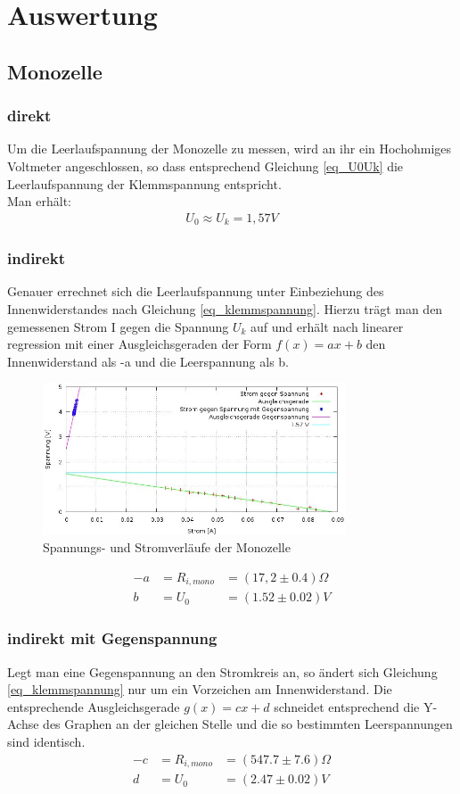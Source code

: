 \section{Auswertung}
\subsection{Monozelle}
\subsubsection{direkt}
Um die Leerlaufspannung der Monozelle zu messen, wird an ihr ein Hochohmiges Voltmeter angeschlossen, so dass entsprechend Gleichung \eqref{eq_U0Uk} die Leerlaufspannung der Klemmspannung entspricht.\\
Man erhält:
\begin{align*}
U_0\approx U_k=1,57V
\end{align*}

\subsubsection{indirekt}
Genauer errechnet sich die Leerlaufspannung unter Einbeziehung des Innenwiderstandes nach Gleichung \eqref{eq_klemmspannung}. Hierzu trägt man den gemessenen Strom I gegen die Spannung $U_k$  auf und erhält nach linearer regression mit einer Ausgleichsgeraden der Form $f(x)=ax +b$ den Innenwiderstand als -a und die Leerspannung als b.
\begin{figure}[htbp]
\includegraphics[width=0.8\textwidth]{pics/konst_beide.jpeg}
\caption{Spannungs- und Stromverläufe der Monozelle}
\end{figure}
\begin{align*}
-a &= R_{i,mono} &= (17,2\pm 0.4) \Omega\\
b &= U_0 &= (1.52 \pm 0.02) V
\end{align*}
\subsubsection{indirekt mit Gegenspannung}
Legt man eine Gegenspannung an den Stromkreis an, so ändert sich Gleichung \eqref{eq_klemmspannung} nur um ein Vorzeichen am Innenwiderstand. Die entsprechende Ausgleichsgerade $g(x)=cx +d$ schneidet entsprechend die Y-Achse des Graphen an der gleichen Stelle und die so bestimmten Leerspannungen sind identisch.
\begin{align*}
-c &= R_{i,mono} &= (547.7    \pm 7.6) \Omega\\
d &= U_0 &= (2.47   \pm 0.02) V
\end{align*}

